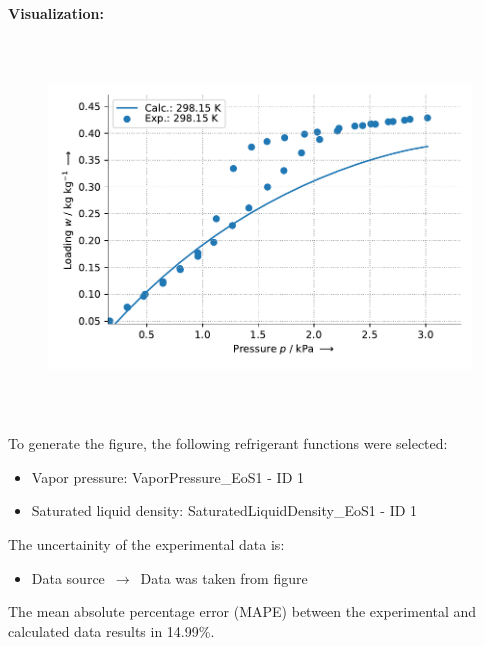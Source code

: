 \textbf{Visualization:}
%
\begin{figure}[!htp]
{\noindent\includegraphics[height=10cm, keepaspectratio]{figs/ads/ads_Water_silica_gel_pellet_Mayekawa_A++_DubininAstakhov_1.pdf}}
\end{figure}
%

To generate the figure, the following refrigerant functions were selected:
\begin{itemize}
\item Vapor pressure: VaporPressure\_EoS1 - ID 1
\item Saturated liquid density: SaturatedLiquidDensity\_EoS1 - ID 1
\end{itemize}

The uncertainity of the experimental data is:
\begin{itemize}
\item Data source $\,\to\,$ Data was taken from figure
\end{itemize}

The mean absolute percentage error (MAPE) between the experimental and calculated data results in 14.99\%.
\FloatBarrier
\newpage

